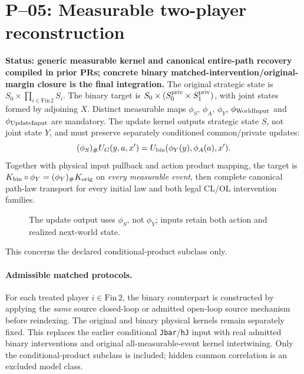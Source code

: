 \section{P--05: Measurable two-player reconstruction}
\textbf{Status: generic measurable kernel and canonical entire-path recovery compiled in prior PRs; concrete binary matched-intervention/original-margin closure is the final integration.}
The original strategic state is $S_0\times\prod_{i\in\mathrm{Fin}\,2}S_i$.
The binary target is $S_0\times(S_0^{\rm priv}\times S_1^{\rm priv})$,
with joint states formed by adjoining $X$. Distinct measurable maps
$\phi_S$, $\phi_A$, $\phi_Y$, $\phi_{\rm WorldInput}$ and
$\phi_{\rm UpdateInput}$ are mandatory. The update kernel outputs
strategic state $S$, not joint state $Y$, and must preserve separately
conditioned common/private updates:
\[
(\phi_S)_\#U_G(y,a,x')
=U_{\rm bin}(\phi_Y(y),\phi_A(a),x').
\]
Together with physical input pullback and action product mapping,
the target is $K_{\rm bin}\circ\phi_Y=(\phi_Y)_\#K_{\rm orig}$
on \emph{every measurable event}, then complete canonical path-law
transport for every initial law and both legal CL/OL intervention families.
\begin{figure}[htbp]\centering
{}
\caption{The update output uses $\phi_S$, not $\phi_Y$; inputs retain
both action and realized next-world state.}
\end{figure}
This concerns the declared conditional-product subclass only.


\paragraph{Admissible matched protocols.}
For each treated player $i\in\mathrm{Fin}\,2$, the binary counterpart is
constructed by applying the \emph{same} source closed-loop or admitted
open-loop source mechanism before reindexing. The original and binary
physical kernels remain separately fixed. This replaces the earlier
conditional \texttt{Jbar}/\texttt{hJ} input with real admitted binary
interventions and original all-measurable-event kernel intertwining.
Only the conditional-product subclass is included; hidden common
correlation is an excluded model class.
